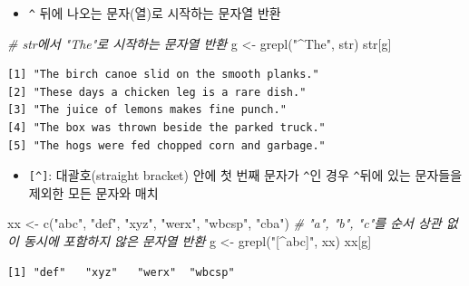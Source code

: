 \documentclass[
  11pt,
]{krantz}
\newenvironment{Shaded}{\begin{snugshade}}{\end{snugshade}}
\newcommand{\CommentTok}[1]{\textcolor[rgb]{0.37,0.37,0.37}{\textit{#1}}}
\newcommand{\FunctionTok}[1]{\textcolor[rgb]{0,0,0}{#1}}
\newcommand{\NormalTok}[1]{#1}
\newcommand{\OtherTok}[1]{\textcolor[rgb]{0.37,0.37,0.37}{#1}}
\newcommand{\StringTok}[1]{\textcolor[rgb]{0.5,0.5,0.5}{#1}}
\providecommand{\tightlist}{%
  \setlength{\itemsep}{0pt}\setlength{\parskip}{0pt}}
\begin{document}
\begin{itemize}
\tightlist
\item
  \texttt{\^{}} 뒤에 나오는 문자(열)로 시작하는 문자열 반환
\end{itemize}

\footnotesize

\begin{Shaded}
\begin{Highlighting}[]
\CommentTok{\# str에서 "The"로 시작하는 문자열 반환}
\NormalTok{g }\OtherTok{\textless{}{-}} \FunctionTok{grepl}\NormalTok{(}\StringTok{"\^{}The"}\NormalTok{, str)}
\NormalTok{str[g]}
\end{Highlighting}
\end{Shaded}

\begin{verbatim}
[1] "The birch canoe slid on the smooth planks." 
[2] "These days a chicken leg is a rare dish."   
[3] "The juice of lemons makes fine punch."      
[4] "The box was thrown beside the parked truck."
[5] "The hogs were fed chopped corn and garbage."
\end{verbatim}

\normalsize

\begin{itemize}
\tightlist
\item
  \texttt{{[}\^{}{]}}: 대괄호(straight bracket) 안에 첫 번째 문자가 \texttt{\^{}}인 경우 \texttt{\^{}}뒤에 있는 문자들을 제외한 모든 문자와 매치
\end{itemize}

\footnotesize

\begin{Shaded}
\begin{Highlighting}[]
\NormalTok{xx }\OtherTok{\textless{}{-}} \FunctionTok{c}\NormalTok{(}\StringTok{"abc"}\NormalTok{, }\StringTok{"def"}\NormalTok{, }\StringTok{"xyz"}\NormalTok{, }\StringTok{"werx"}\NormalTok{, }\StringTok{"wbcsp"}\NormalTok{, }\StringTok{"cba"}\NormalTok{)}
\CommentTok{\# "a", "b", "c"를 순서 상관 없이 동시에 포함하지 않은 문자열 반환}
\NormalTok{g }\OtherTok{\textless{}{-}} \FunctionTok{grepl}\NormalTok{(}\StringTok{"[\^{}abc]"}\NormalTok{, xx)}
\NormalTok{xx[g]}
\end{Highlighting}
\end{Shaded}

\begin{verbatim}
[1] "def"   "xyz"   "werx"  "wbcsp"
\end{verbatim}

\normalsize
\end{document}
